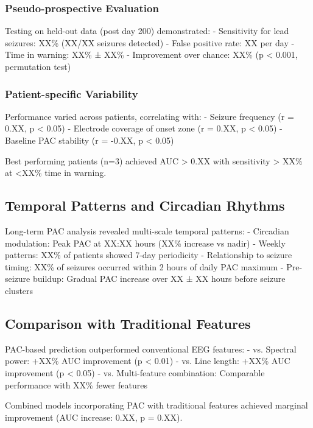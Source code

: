 \subsubsection{Pseudo-prospective Evaluation}
Testing on held-out data (post day 200) demonstrated:
- Sensitivity for lead seizures: XX\% (XX/XX seizures detected)
- False positive rate: XX per day
- Time in warning: XX\% ± XX\%
- Improvement over chance: XX\% (p < 0.001, permutation test)

\subsubsection{Patient-specific Variability}
Performance varied across patients, correlating with:
- Seizure frequency (r = 0.XX, p < 0.05)
- Electrode coverage of onset zone (r = 0.XX, p < 0.05)
- Baseline PAC stability (r = -0.XX, p < 0.05)

Best performing patients (n=3) achieved AUC > 0.XX with sensitivity > XX\% at <XX\% time in warning.

\subsection{Temporal Patterns and Circadian Rhythms}

Long-term PAC analysis revealed multi-scale temporal patterns:
- Circadian modulation: Peak PAC at XX:XX hours (XX\% increase vs nadir)
- Weekly patterns: XX\% of patients showed 7-day periodicity
- Relationship to seizure timing: XX\% of seizures occurred within 2 hours of daily PAC maximum
- Pre-seizure buildup: Gradual PAC increase over XX ± XX hours before seizure clusters

\subsection{Comparison with Traditional Features}

PAC-based prediction outperformed conventional EEG features:
- vs. Spectral power: +XX\% AUC improvement (p < 0.01)
- vs. Line length: +XX\% AUC improvement (p < 0.05)
- vs. Multi-feature combination: Comparable performance with XX\% fewer features

Combined models incorporating PAC with traditional features achieved marginal improvement (AUC increase: 0.XX, p = 0.XX).

\label{sec:results}
